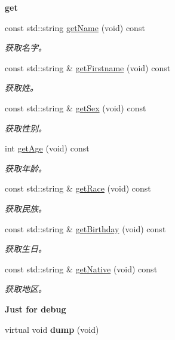 \begin{Indent}{\bf get}\par
\begin{DoxyCompactItemize}
\item 
const std\-::string \hyperlink{classepPerson_a39e44b50140a70362a52bc4464cf7f64}{get\-Name} (void) const 
\begin{DoxyCompactList}\small\item\em 获取名字。 \end{DoxyCompactList}\item 
const std\-::string \& \hyperlink{classepPerson_ab833f824642668fd9b11532cf4672093}{get\-Firstname} (void) const 
\begin{DoxyCompactList}\small\item\em 获取姓。 \end{DoxyCompactList}\item 
const std\-::string \& \hyperlink{classepPerson_af7200f4719ea2bfe506e4b68aafae3ab}{get\-Sex} (void) const 
\begin{DoxyCompactList}\small\item\em 获取性别。 \end{DoxyCompactList}\item 
int \hyperlink{classepPerson_aa454d50b639da728a2c9a44510f8cc29}{get\-Age} (void) const 
\begin{DoxyCompactList}\small\item\em 获取年龄。 \end{DoxyCompactList}\item 
const std\-::string \& \hyperlink{classepPerson_a4b15bc494bcad77f2edcf19c5d5dd235}{get\-Race} (void) const 
\begin{DoxyCompactList}\small\item\em 获取民族。 \end{DoxyCompactList}\item 
const std\-::string \& \hyperlink{classepPerson_a86072c8c7079512a1fbc2e7bf846ba5d}{get\-Birthday} (void) const 
\begin{DoxyCompactList}\small\item\em 获取生日。 \end{DoxyCompactList}\item 
const std\-::string \& \hyperlink{classepPerson_accc330cb6410ce40ff3a3ef77afa4198}{get\-Native} (void) const 
\begin{DoxyCompactList}\small\item\em 获取地区。 \end{DoxyCompactList}\end{DoxyCompactItemize}
\end{Indent}
\begin{Indent}{\bf \-Just for debug}\par
\begin{DoxyCompactItemize}
\item 
\hypertarget{classepPerson_ae867a543885e3b612228e6f4028887b5}{virtual void {\bfseries dump} (void)}\label{classepPerson_ae867a543885e3b612228e6f4028887b5}

\end{DoxyCompactItemize}
\end{Indent}


